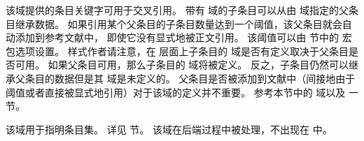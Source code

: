 \begin{fieldlist}




该域提供的条目关键字可用于交叉引用。
带有  域的子条目可以从由  域指定的父条目继承数据。
如果引用某个父条目的子条目数量达到一个阈值，该父条目就会自动添加到参考文献中，
即使它没有显式地被正文引用。
该阈值可以由  节中的  宏包选项设置。
样式作者请注意，在 \biblatex 层面上子条目的  域是否有定义取决于父条目是否可用。
如果父条目可用，那么子条目的  域将被定义。
反之，子条目仍然可以继承父条目的数据但是其  域是未定义的。
父条目是否被添加到文献中（间接地由于阈值或者直接被显式地引用）对于该域的定义并不重要。
参考本节中的  域以及  一节。




该域用于指明条目集。
详见  节。
该域在后端过程中被处理，不出现在  中。


\end{fieldlist}
